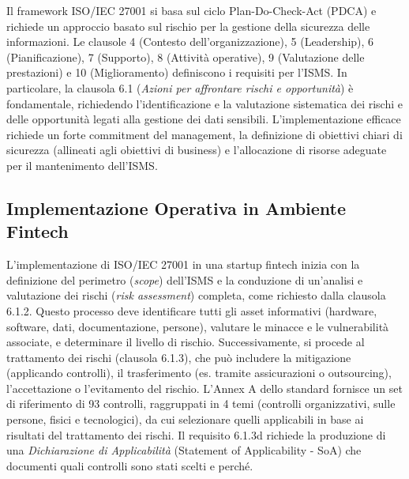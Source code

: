 Il framework ISO/IEC 27001 si basa sul ciclo Plan-Do-Check-Act (PDCA) e richiede un approccio basato sul rischio per la gestione della sicurezza delle informazioni. Le clausole 4 (Contesto dell'organizzazione), 5 (Leadership), 6 (Pianificazione), 7 (Supporto), 8 (Attività operative), 9 (Valutazione delle prestazioni) e 10 (Miglioramento) definiscono i requisiti per l'ISMS. In particolare, la clausola 6.1 (\textit{Azioni per affrontare rischi e opportunità}) è fondamentale, richiedendo l'identificazione e la valutazione sistematica dei rischi e delle opportunità legati alla gestione dei dati sensibili. L'implementazione efficace richiede un forte commitment del management, la definizione di obiettivi chiari di sicurezza (allineati agli obiettivi di business) e l'allocazione di risorse adeguate per il mantenimento dell'ISMS.

\subsection{Implementazione Operativa in Ambiente Fintech}
L'implementazione di ISO/IEC 27001 in una startup fintech inizia con la definizione del perimetro (\textit{scope}) dell'ISMS e la conduzione di un'analisi e valutazione dei rischi (\textit{risk assessment}) completa, come richiesto dalla clausola 6.1.2. Questo processo deve identificare tutti gli asset informativi (hardware, software, dati, documentazione, persone), valutare le minacce e le vulnerabilità associate, e determinare il livello di rischio. Successivamente, si procede al trattamento dei rischi (clausola 6.1.3), che può includere la mitigazione (applicando controlli), il trasferimento (es. tramite assicurazioni o outsourcing), l'accettazione o l'evitamento del rischio. L'Annex A dello standard fornisce un set di riferimento di 93 controlli, raggruppati in 4 temi (controlli organizzativi, sulle persone, fisici e tecnologici), da cui selezionare quelli applicabili in base ai risultati del trattamento dei rischi. Il requisito 6.1.3d richiede la produzione di una \textit{Dichiarazione di Applicabilità} (Statement of Applicability - SoA) che documenti quali controlli sono stati scelti e perché.

